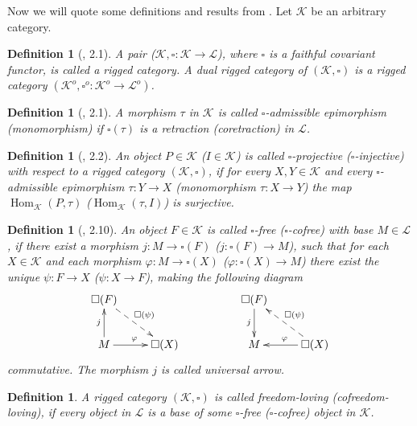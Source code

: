 \documentclass[12pt]{article}
\newtheorem{definition}[theorem]{Definition}
\begin{document}
Now we will quote some definitions and results from \cite{HelMetrFrQmod}. Let $\mathcal{K}$ be an arbitrary category.
\begin{definition}[\cite{HelMetrFrQmod}, 2.1]\label{DefRigCat}
A pair ($\mathcal{K}, \square:\mathcal{K}\to\mathcal{L}$), where $\square$ is a faithful covariant functor, is called a rigged category. A dual rigged category of $(\mathcal{K}, \square)$ 
is a rigged category $(\mathcal{K}^{o},\square^{o}:\mathcal{K}^{o}\to\mathcal{L}^{o})$. 
\end{definition}
\begin{definition}[\cite{HelMetrFrQmod}, 2.1]\label{DefAdmMorph}
A morphism $\tau$ in $\mathcal{K}$ is called $\square$-admissible epimorphism (monomorphism) if $\square (\tau)$ is a retraction (coretraction) in $\mathcal{L}$.
\end{definition}
\begin{definition}[\cite{HelMetrFrQmod}, 2.2]\label{DefProjInj}
An object $P\in \mathcal{K}$ ($I \in \mathcal{K}$) is called $\square$-projective ($\square$-injective) with respect to a rigged category $(\mathcal{K}, \square)$, if for every $X,Y\in\mathcal{K}$ and every $\square$-admissible epimorphism $\tau : Y \to X$ (monomorphism $\tau : X \to Y$)  the map $\operatorname{Hom}_{\mathcal{K}}(P,\tau)$ ($\operatorname{Hom}_{\mathcal{K}}(\tau, I)$) is surjective.
\end{definition}
\begin{definition}[\cite{HelMetrFrQmod}, 2.10]\label{DefFrAndCoFr}
An object $F \in \mathcal{K}$ is called $\square$-free ($\square$-cofree) with base $M \in \mathcal{L}$, if there exist a morphism $j : M \to \square(F)$ ($j : \square(F) \to M$), 
such that for each $X \in \mathcal{K}$ and each morphism $\varphi : M \to \square(X)$ ($\varphi : \square(X) \to M$) there exist the unique $\psi : F \to X$ ($\psi : X \to F$), 
making the following diagram
$$
\xymatrix{
{\square (F)} \ar@{-->}[dr]^{\square (\psi)} & \\
{M} \ar[u]^{j} \ar[r]^{\varphi} &{\square (X)}}
\qquad\qquad\quad
\xymatrix{
{\square (F)} \ar[d]_{j} & \\
{M} &{\square (X)} \ar[l]_\varphi \ar@{-->}[ul]_{\square(\psi)}
}
$$
commutative. The morphism $j$ is called universal arrow.
\end{definition}
\begin{definition}\label{DefFrAndCoFrLove}
A rigged category $(\mathcal{K},\square)$ is called freedom-loving (cofreedom-loving), if every object in $\mathcal{L}$ is a base of some $\square$-free ($\square$-cofree) object in $\mathcal{K}$.
\end{definition}
\end{document}
